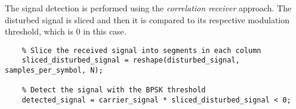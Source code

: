 \label{demodulation}\noindent The signal detection is performed using the \textsl{correlation receiver} approach. The disturbed signal is sliced and then it is compared to its respective modulation threshold, which is 0 in this case.

\begin{lstlisting}
    % Slice the received signal into segments in each column
    sliced_disturbed_signal = reshape(disturbed_signal, samples_per_symbol, N);
    
    % Detect the signal with the BPSK threshold
    detected_signal = carrier_signal * sliced_disturbed_signal < 0;
\end{lstlisting}